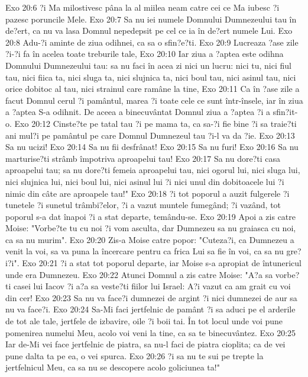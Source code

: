 Exo 20:6  ?i Ma milostivesc pâna la al miilea neam catre cei ce Ma iubesc ?i pazesc poruncile Mele.
Exo 20:7  Sa nu iei numele Domnului Dumnezeului tau în de?ert, ca nu va lasa Domnul nepedepsit pe cel ce ia în de?ert numele Lui.
Exo 20:8  Adu-?i aminte de ziua odihnei, ca sa o sfin?e?ti.
Exo 20:9  Lucreaza ?ase zile ?i-?i fa în acelea toate treburile tale,
Exo 20:10  Iar ziua a ?aptea este odihna Domnului Dumnezeului tau: sa nu faci în acea zi nici un lucru: nici tu, nici fiul tau, nici fiica ta, nici sluga ta, nici slujnica ta, nici boul tau, nici asinul tau, nici orice dobitoc al tau, nici strainul care ramâne la tine,
Exo 20:11  Ca în ?ase zile a facut Domnul cerul ?i pamântul, marea ?i toate cele ce sunt într-însele, iar în ziua a ?aptea S-a odihnit. De aceea a binecuvântat Domnul ziua a ?aptea ?i a sfin?it-o.
Exo 20:12  Cinste?te pe tatal tau ?i pe mama ta, ca sa-?i fie bine ?i sa traie?ti ani mul?i pe pamântul pe care Domnul Dumnezeul tau ?i-l va da ?ie.
Exo 20:13  Sa nu ucizi!
Exo 20:14  Sa nu fii desfrânat!
Exo 20:15  Sa nu furi!
Exo 20:16  Sa nu marturise?ti strâmb împotriva aproapelui tau!
Exo 20:17  Sa nu dore?ti casa aproapelui tau; sa nu dore?ti femeia aproapelui tau, nici ogorul lui, nici sluga lui, nici slujnica lui, nici boul lui, nici asinul lui ?i nici unul din dobitoacele lui ?i nimic din câte are aproapele tau!"
Exo 20:18  ?i tot poporul a auzit fulgerele ?i tunetele ?i sunetul trâmbi?elor, ?i a vazut muntele fumegând; ?i vazând, tot poporul s-a dat înapoi ?i a stat departe, temându-se.
Exo 20:19  Apoi a zis catre Moise: "Vorbe?te tu cu noi ?i vom asculta, dar Dumnezeu sa nu graiasca cu noi, ca sa nu murim".
Exo 20:20  Zis-a Moise catre popor: "Cuteza?i, ca Dumnezeu a venit la voi, sa va puna la încercare pentru ca frica Lui sa fie în voi, ca sa nu gre?i?i".
Exo 20:21  ?i a stat tot poporul departe, iar Moise s-a apropiat de întunericul unde era Dumnezeu.
Exo 20:22  Atunci Domnul a zis catre Moise: "A?a sa vorbe?ti casei lui Iacov ?i a?a sa veste?ti fiilor lui Israel: A?i vazut ca am grait cu voi din cer!
Exo 20:23  Sa nu va face?i dumnezei de argint ?i nici dumnezei de aur sa nu va face?i.
Exo 20:24  Sa-Mi faci jertfelnic de pamânt ?i sa aduci pe el arderile de tot ale tale, jertfele de izbavire, oile ?i boii tai. În tot locul unde voi pune pomenirea numelui Meu, acolo voi veni la tine, ca sa te binecuvântez.
Exo 20:25  Iar de-Mi vei face jertfelnic de piatra, sa nu-l faci de piatra cioplita; ca de vei pune dalta ta pe ea, o vei spurca.
Exo 20:26  ?i sa nu te sui pe trepte la jertfelnicul Meu, ca sa nu se descopere acolo goliciunea ta!"
